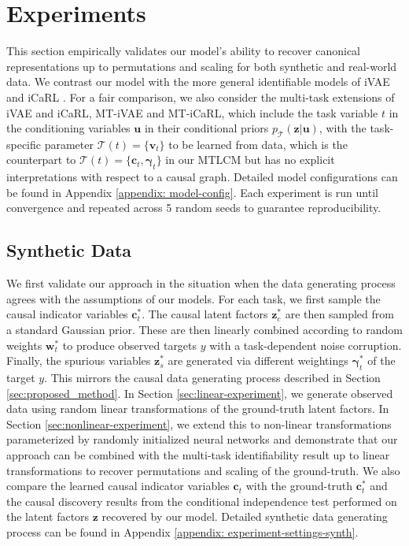 \documentclass{article} %
\theoremstyle{plain}
\theoremstyle{definition}
\theoremstyle{remark}
\begin{document}
\vspace{-1ex}
\section{Experiments}\label{sec:experiments}
\vspace{-1ex}
This section empirically validates our model's ability to recover canonical representations up to permutations and scaling for 
both synthetic and real-world data. 
We contrast our model with the more general identifiable models of iVAE \citep{Khemakhem_Kingma_Monti_Hyvarinen_2020} and iCaRL \citep{Lu_Wu_Hernandez-Lobato_Scholkopf_2022}. For a fair comparison, we also consider the multi-task extensions of iVAE and iCaRL, MT-iVAE and MT-iCaRL, which include the task variable $t$ in the conditioning variables $\mathbf{u}$ in their conditional priors $p_{\mathcal{T}}(\mathbf{z}|\mathbf{u})$, with the task-specific parameter $\mathcal{T}(t)=\{\mathbf{v}_t\}$ to be learned from data, which is the counterpart to $\mathcal{T}(t)=\{\mathbf{c}_t,\boldsymbol{\gamma}_t\}$ in our MTLCM but has no explicit interpretations with respect to a causal graph. 
Detailed model configurations can be found in Appendix \ref{appendix: model-config}. Each experiment is run until convergence and repeated across 5 random seeds to guarantee reproducibility.

\subsection{Synthetic Data}\label{sec:synthetic_exp}
\vspace{-0.75ex}
We first validate our approach in the situation when the data generating process 
agrees with the assumptions of our models. For each task, we first sample the causal indicator variables $\mathbf{c}_t^*$. The causal latent factors $\mathbf{z}_c^*$ are then sampled from a standard Gaussian prior. These are then linearly combined according to random weights $\mathbf{w}_t^*$ to produce observed 
targets $y$ with a task-dependent noise corruption. Finally, the spurious variables $\mathbf{z}_s^*$ are generated via different weightings $\boldsymbol{\gamma}_t^*$ of the target $y$. This mirrors the causal data generating process described in Section \ref{sec:proposed_method}. In Section \ref{sec:linear-experiment}, we generate
observed data using random linear transformations of the ground-truth latent factors. 
In Section \ref{sec:nonlinear-experiment}, we extend this to non-linear transformations parameterized by randomly initialized neural networks and demonstrate that our approach can be combined with 
the multi-task identifiability result up to linear transformations to recover permutations and scaling of the ground-truth.
We also compare the learned causal indicator variables $\mathbf{c}_t$ with the ground-truth $\mathbf{c}_t^{*}$ and the causal discovery results from the conditional independence test \citep{chen2021causal,Lu_Wu_Hernandez-Lobato_Scholkopf_2022} performed on the latent factors $\mathbf{z}$ recovered by our model. Detailed synthetic data generating process can be found in Appendix \ref{appendix: experiment-settings-synth}.
\end{document}

